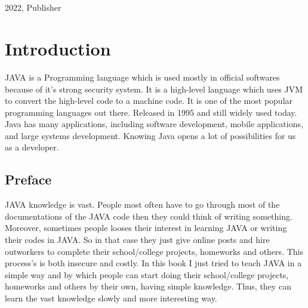 \documentclass[openany]{book}  %
\begin{document}
\begin{titlepage}
{\begin{verbatim}
                                                                                                      
                                                                                                      
        \end{verbatim}
    }
    \vfill
    {\small{2022, Publisher}}
\end{titlepage}


\pagecolor{smokeWhite}
\color{black}
\newpage
\tableofcontents
\newpage
\listoffigures
\newpage
\listoftables
\newpage
\setlength{\evensidemargin}{1.44614pt}           %
% 
% 
\part{Introduction}
JAVA\cite{Ref1} is a Programming language which is used mostly in official softwares because of it's strong security system.
It is a high-level language which uses JVM to convert the high-level code to a machine code.
It is one of the most popular programming languages out there. Released in 1995 and still widely used today.
Java has many applications, including software development, mobile applications, and large systems development.
Knowing Java opens a lot of possibilities for us as a developer.

\chapter*{Preface}
JAVA\cite{Ref1} knowledge is vast. People most often have to go through most of the documentations of the JAVA code then they could think of writing something.
Moreover, sometimes people looses their interest in learning JAVA or writing their codes in JAVA. So in that case they just give online posts
and hire outworkers to complete their school/college projects, homeworks and others.
This process's is both insecure and costly. In this book I just tried to teach JAVA in a simple way and by which
people can start doing their school/college projects, homeworks and others by their own, having simple knowledge. Thus, they can learn the vast knowledge slowly and more interesting way.

% 
% 
\end{document}
